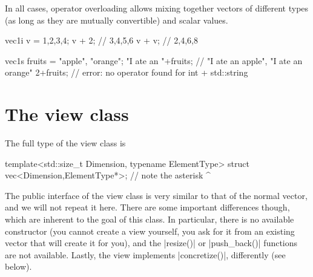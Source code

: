 \documentclass[12pt,a4paper]{report}
\newenvironment{example}
{
    \begin{mdframed}[style=example,frametitle={Example}]
}
{
    \end{mdframed}
}
\newcommand{\cppbool}{\cppinline{bool}\xspace}
\begin{document}

In all cases, operator overloading allows mixing together vectors of different types (as long as they are mutually convertible) and scalar values.

\begin{example}
\begin{cppcode}
vec1i v = {1,2,3,4};
v + 2; // {3,4,5,6}
v + v; // {2,4,6,8}

vec1s fruits = {"apple", "orange"};
"I ate an "+fruits; // {"I ate an apple", "I ate an orange"}
2+fruits;           // error: no operator found for int + std::string
\end{cppcode}
\end{example}

\section{The view class \label{SEC:core:view}}

The full type of the view class is
\begin{cppcode}
template<std::size_t Dimension, typename ElementType>
struct vec<Dimension,ElementType*>;
//            note the asterisk ^
\end{cppcode}

The public interface of the view class is very similar to that of the normal vector, and we will not repeat it here. There are some important differences though, which are inherent to the goal of this class. In particular, there is no available constructor (you cannot create a view yourself, you ask for it from an existing vector that will create it for you), and the \cppinline|resize()| or \cppinline|push_back()| functions are not available. Lastly, the view implements \cppinline|concretize()|, differently (see below).
\end{document}
